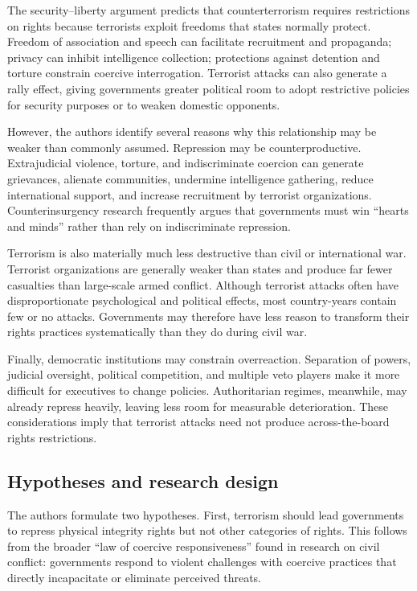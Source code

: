 The security--liberty argument predicts that counterterrorism requires restrictions on rights because terrorists exploit freedoms that states normally protect. Freedom of association and speech can facilitate recruitment and propaganda; privacy can inhibit intelligence collection; protections against detention and torture constrain coercive interrogation. Terrorist attacks can also generate a rally effect, giving governments greater political room to adopt restrictive policies for security purposes or to weaken domestic opponents.

However, the authors identify several reasons why this relationship may be weaker than commonly assumed. Repression may be counterproductive. Extrajudicial violence, torture, and indiscriminate coercion can generate grievances, alienate communities, undermine intelligence gathering, reduce international support, and increase recruitment by terrorist organizations. Counterinsurgency research frequently argues that governments must win ``hearts and minds'' rather than rely on indiscriminate repression.

Terrorism is also materially much less destructive than civil or international war. Terrorist organizations are generally weaker than states and produce far fewer casualties than large-scale armed conflict. Although terrorist attacks often have disproportionate psychological and political effects, most country-years contain few or no attacks. Governments may therefore have less reason to transform their rights practices systematically than they do during civil war.

Finally, democratic institutions may constrain overreaction. Separation of powers, judicial oversight, political competition, and multiple veto players make it more difficult for executives to change policies. Authoritarian regimes, meanwhile, may already repress heavily, leaving less room for measurable deterioration. These considerations imply that terrorist attacks need not produce across-the-board rights restrictions.

\subsection{Hypotheses and research design}

The authors formulate two hypotheses. First, terrorism should lead governments to repress physical integrity rights but not other categories of rights. This follows from the broader ``law of coercive responsiveness'' found in research on civil conflict: governments respond to violent challenges with coercive practices that directly incapacitate or eliminate perceived threats.

